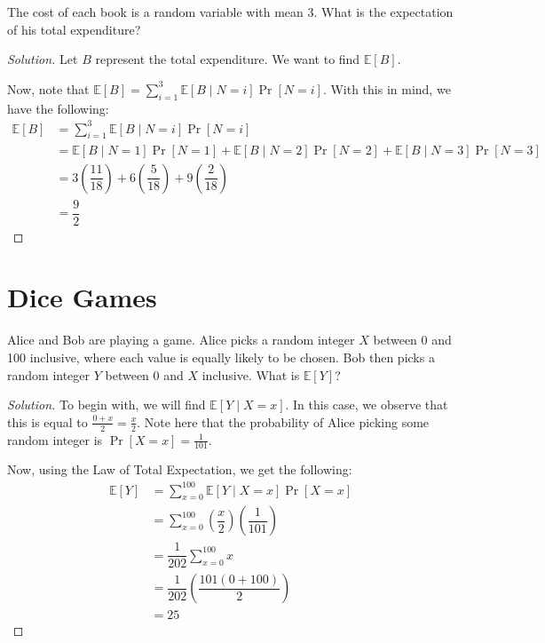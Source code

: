 \documentclass{article}
\newenvironment{solution}{\begin{proof}[Solution]}{\end{proof}}
\newcommand{\E}{\mathbb{E}}
\let\oldsum\sum
\renewcommand{\sum}[2]{\oldsum\limits_{#1}^{#2}}
\begin{document}
\begin{hw}
	The cost of each book is a random variable with mean 3.  What is the expectation of his total expenditure?
\end{hw}
\begin{solution}
	Let $B$ represent the total expenditure. We want to find $\E[B]$.
	
	Now, note that $\E[B] = \sum{i=1}{3} \E[B \mid N = i]\Pr[N = i]$. With this in mind, we have the following:
	\begin{align*}
		\E[B] &= \sum{i=1}{3} \E[B \mid N = i]\Pr[N = i] \\
		&= \E[B \mid N = 1]\Pr[N = 1] + \E[B \mid N = 2]\Pr[N = 2] + \E[B \mid N = 3]\Pr[N = 3] \\
		&= 3\left( \dfrac{11}{18} \right) + 6\left( \dfrac{5}{18} \right) + 9\left( \dfrac{2}{18} \right) \\
		&= \dfrac{9}{2}
	\end{align*}
\end{solution}

\newpage

\section{Dice Games}
\begin{hw}
	Alice and Bob are playing a game. Alice picks a random integer $X$ between 0 and 100 inclusive, where each value is equally likely to be chosen. Bob then picks a random integer $Y$ between $0$ and $X$ inclusive. What is $\E[Y]$?
\end{hw}
\begin{solution}
	To begin with, we will find $\E[Y \mid X = x]$. In this case, we observe that this is equal to $\frac{0 + x}{2} = \frac{x}{2}$. Note here that the probability of Alice picking some random integer is $\Pr[X = x] = \frac{1}{101}$.
	
	Now, using the Law of Total Expectation, we get the following:
	\begin{align*}
		\E[Y] &= \sum{x=0}{100} \E[Y \mid X = x]\Pr[X = x] \\
		&= \sum{x=0}{100} \left( \dfrac{x}{2} \right)\left( \dfrac{1}{101} \right) \\
		&= \dfrac{1}{202} \sum{x=0}{100} x \\
		&= \dfrac{1}{202}\left( \dfrac{101(0+100)}{2} \right) \\
		&= 25
	\end{align*}
\end{solution}
\end{document}
